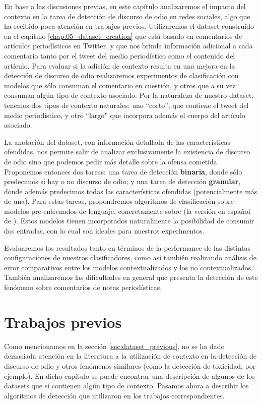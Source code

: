 \label{chap:06_contextualized_hate_speech}
En base a las discusiones previas, en este capítulo analizaremos el impacto del contexto en la tarea de detección de discurso de odio en redes sociales, algo que ha recibido poca atención en trabajos previos. Utilizaremos el dataset construído en el capítulo \ref{chap:05_dataset_creation} que está basado en comentarios de artículos periodísticos en Twitter, y que nos brinda información adicional a cada comentario tanto por el tweet del medio periodístico como el contenido del artículo. Para evaluar si la adición de contexto resulta en una mejora en la detección de discurso de odio realizaremos experimentos de clasificación con modelos que sólo consuman el comentario en cuestión, y otros que a su vez consuman algún tipo de contexto asociado. Por la naturaleza de nuestro dataset, tenemos dos tipos de contexto naturales: uno ``corto'', que contiene el tweet del medio periodístico, y otro ``largo'' que incorpora además el cuerpo del artículo asociado.

La anotación del dataset, con información detallada de las características ofendidas, nos permite salir de analizar exclusivamente la existencia de discurso de odio sino que podemos pedir más detalle sobre la ofensa cometida. Proponemos entonces dos tareas: una tarea de detección \textbf{binaria}, donde sólo predecimos si hay o no discurso de odio; y una tarea de detección \textbf{granular}, donde además predecimos todas las características ofendidas (potencialmente más de una). Para estas tareas, propondremos algoritmos de clasificación sobre modelos pre-entrenados de lenguaje, concretamente sobre \beto{} (la versión en español de \bert{}). Estos modelos tienen incorporados naturalmente la posibilidad de consumir dos entradas, con lo cual son ideales para nuestros experimentos.

Evaluaremos los resultados tanto en términos de la performance de las distintas configuraciones de nuestros clasificadores, como así también realizando análisis de error comparativos entre los modelos contextualizados y los no contextualizados. También analizaremos las dificultades en general que presenta la detección de este fenómeno sobre comentarios de notas periodísticas.

\section{Trabajos previos}
\label{sec:06_classification_previous}

Como mencionamos en la sección \ref{sec:dataset_previous}, no se ha dado demasiada atención en la literatura a la utilización de contexto en la detección de discurso de odio y otros fenómenos similares (como la detección de toxicidad, por ejemplo). En dicho capítulo se puede encontrar una descripción de algunos de los datasets que sí contienen algún tipo de contexto. Pasamos ahora a describir los algoritmos de detección que utilizaron en los trabajos correspondientes.

